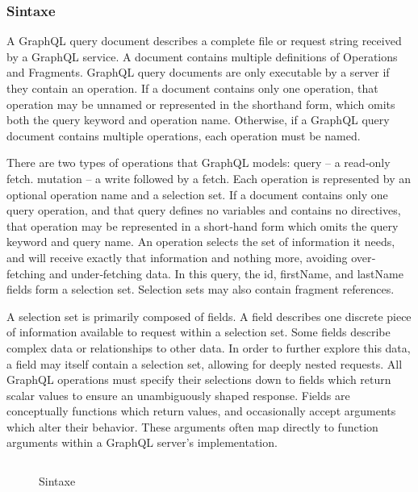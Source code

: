 \subsubsection[Sintaxe]{Sintaxe}

A GraphQL query document describes a complete file or request string received by a GraphQL service. A document contains multiple definitions of Operations and Fragments. GraphQL query documents are only executable by a server if they contain an operation. If a document contains only one operation, that operation may be unnamed or represented in the shorthand form, which omits both the query keyword and operation name. Otherwise, if a GraphQL query document contains multiple operations, each operation must be named.

There are two types of operations that GraphQL models: query – a read‐only fetch. mutation – a write followed by a fetch. Each operation is represented by an optional operation name and a selection set. If a document contains only one query operation, and that query defines no variables and contains no directives, that operation may be represented in a short‐hand form which omits the query keyword and query name. An operation selects the set of information it needs, and will receive exactly that information and nothing more, avoiding over‐fetching and under‐fetching data. In this query, the id, firstName, and lastName fields form a selection set. Selection sets may also contain fragment references.

A selection set is primarily composed of fields. A field describes one discrete piece of information available to request within a selection set. Some fields describe complex data or relationships to other data. In order to further explore this data, a field may itself contain a selection set, allowing for deeply nested requests. All GraphQL operations must specify their selections down to fields which return scalar values to ensure an unambiguously shaped response. Fields are conceptually functions which return values, and occasionally accept arguments which alter their behavior. These arguments often map directly to function arguments within a GraphQL server’s implementation.

\begin{figure}[H]
  \centering
  \inputminted[frame=single,framesep=10pt]{javascript}{anexos/graphql-syntax.graphql}
  \caption{Sintaxe}
\end{figure}

